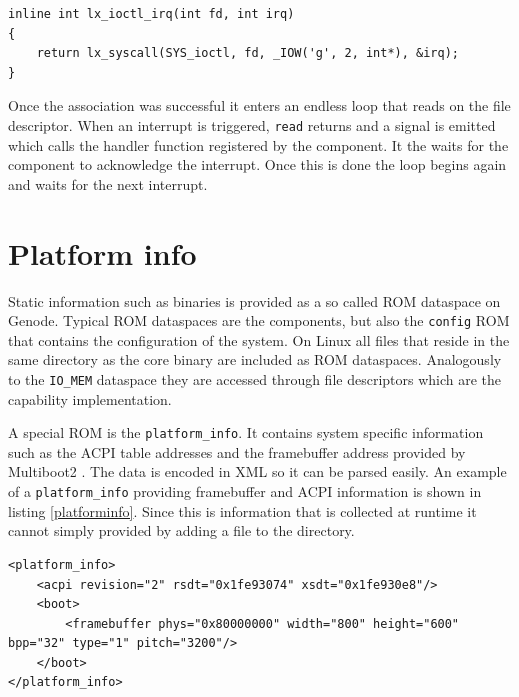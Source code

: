 \documentclass[
a4paper,
11pt,
twoside
]{report}
\begin{document}
		\begin{lstlisting}[basicstyle=\ttfamily\footnotesize]
inline int lx_ioctl_irq(int fd, int irq)
{
	return lx_syscall(SYS_ioctl, fd, _IOW('g', 2, int*), &irq);
}
		\end{lstlisting}
		
		Once the association was successful it enters an endless loop that reads on the file descriptor.
		When an interrupt is triggered, \texttt{read} returns and a signal is emitted which calls the handler function registered by the component.
		It the waits for the component to acknowledge the interrupt.
		Once this is done the loop begins again and waits for the next interrupt.
		
		\section{Platform info}
		\label{pinfo}
		
		Static information such as binaries is provided as a so called ROM dataspace on Genode.
		Typical ROM dataspaces are the components, but also the \texttt{config} ROM that contains the configuration of the system.
		On Linux all files that reside in the same directory as the core binary are included as ROM dataspaces.
		Analogously to the \texttt{IO\_MEM} dataspace they are accessed through file descriptors which are the capability implementation.
		
		A special ROM is the \texttt{platform\_info}.
		It contains system specific information such as the ACPI \citep{acpi_spec} table addresses and the framebuffer address provided by Multiboot2 \citep{multiboot2}.
		The data is encoded in XML so it can be parsed easily.
		An example of a \texttt{platform\_info} providing framebuffer and ACPI information is shown in listing \ref{platforminfo}.
		Since this is information that is collected at runtime it cannot simply provided by adding a file to the directory.
		
		\begin{lstlisting}[basicstyle=\ttfamily\footnotesize]
<platform_info>
	<acpi revision="2" rsdt="0x1fe93074" xsdt="0x1fe930e8"/>
	<boot>
		<framebuffer phys="0x80000000" width="800" height="600" bpp="32" type="1" pitch="3200"/>
	</boot>
</platform_info>
		\end{lstlisting}
		
\end{document}

